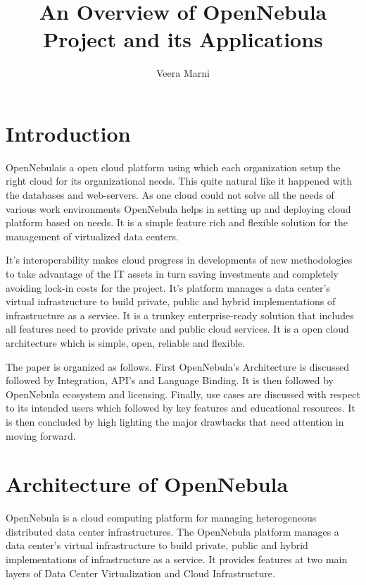 \documentclass[9pt,twocolumn,twoside]{../../styles/osajnl}
\title{An Overview of OpenNebula Project and its Applications}
\author[1]{Veera Marni}
\affil[1]{School of Informatics and Computing, Bloomington, IN 47408, U.S.A.}
\affil[*]{Corresponding authors: vmarni@umail.iu.edu}
\begin{document}
\maketitle

\section{Introduction} 

{OpenNebula}\cite{www-wiki-opennebula}is a open cloud platform 
using which each organization setup the right cloud for its 
organizational needs. This quite natural like it happened with the 
databases and web-servers. {As one cloud could not solve all the 
needs of various work environments OpenNebula helps in setting up and 
deploying cloud platform based on needs}\cite{www-about-opennebula}. 
It is a simple feature rich and flexible solution for the management 
of virtualized data centers.

It's interoperability makes cloud progress in developments of new 
methodologies to take advantage of the IT assets in turn saving 
investments and completely avoiding lock-in costs for the project. 
It's platform manages a data center's virtual infrastructure to build 
private, public and hybrid implementations of infrastructure as a 
service. It is a trunkey enterprise-ready solution that includes all 
features need to provide private and public cloud services. It is a 
open cloud architecture which is simple, open, reliable and 
flexible. 

The paper is organized as follows. First OpenNebula's Architecture is 
discussed followed by Integration, API's and Language Binding. It is 
then followed by OpenNebula ecosystem and licensing. Finally, use 
cases are discussed with respect to its intended users which followed 
by key features and educational resources. It is then concluded by 
high lighting the major drawbacks that need attention in moving 
forward.


\section{Architecture of OpenNebula}

OpenNebula is a cloud computing platform for managing heterogeneous 
distributed data center  infrastructures. The OpenNebula platform 
manages a data center's virtual infrastructure to build private, 
public and hybrid implementations of infrastructure as a service. It 
provides features at two main layers of Data Center Virtualization 
and Cloud Infrastructure.
\end{document}
